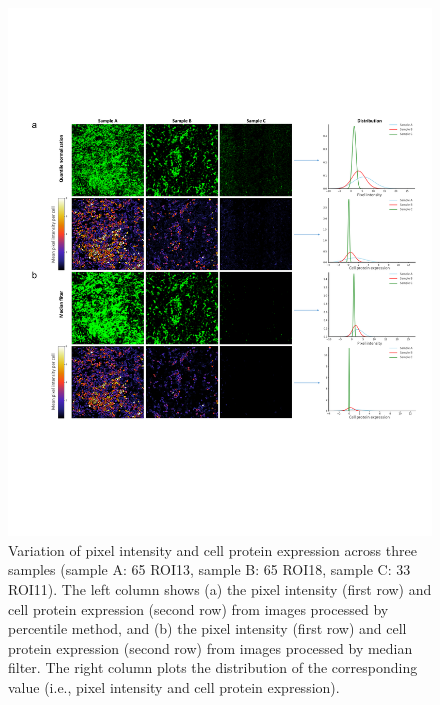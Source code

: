 \documentclass[utf8]{article}
\begin{document}
\begin{figure}[htbp]
\begin{center}
\includegraphics[width=\textwidth]{Figure/FigureS1.pdf}%
\end{center}
\caption{Variation of pixel intensity and cell protein expression across three samples (sample A: 65 ROI13, sample B: 65 ROI18, sample C: 33 ROI11).
The left column shows (a) the pixel intensity (first row) and cell protein expression (second row) from images processed by percentile method, and (b) the pixel intensity (first row) and cell protein expression (second row) from images processed by median filter. The right column plots the distribution of the corresponding value (i.e., pixel intensity and cell protein expression). 
}\label{fig:s1}
\end{figure}



\end{document}
